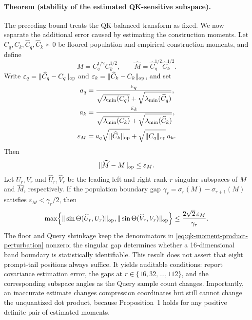 \paragraph{Theorem (stability of the estimated QK-sensitive subspace).}
The preceding bound treats the QK-balanced transform as fixed.  We now
separate the additional error caused by estimating the construction moments.
Let $C_q,C_k,\widehat C_q,\widehat C_k\succ0$ be floored population and
empirical construction moments, and define
\begin{equation}
 M=C_q^{1/2}C_k^{1/2},\qquad
 \widehat M=\widehat C_q^{1/2}\widehat C_k^{1/2}.
\end{equation}
Write $\varepsilon_q=\|\widehat C_q-C_q\|_{\mathrm{op}}$ and
$\varepsilon_k=\|\widehat C_k-C_k\|_{\mathrm{op}}$, and set
\begin{align}
 a_q&=
 \frac{\varepsilon_q}
 {\sqrt{\lambda_{\min}(C_q)}
  +\sqrt{\lambda_{\min}(\widehat C_q)}},\\
 a_k&=
 \frac{\varepsilon_k}
 {\sqrt{\lambda_{\min}(C_k)}
  +\sqrt{\lambda_{\min}(\widehat C_k)}},\\
 \varepsilon_M&=
 a_q\sqrt{\|\widehat C_k\|_{\mathrm{op}}}
 +\sqrt{\|C_q\|_{\mathrm{op}}}\,a_k .
 \label{eq:qk-moment-product-perturbation}
\end{align}
Then
\begin{equation}
 \|\widehat M-M\|_{\mathrm{op}}\le\varepsilon_M.
 \label{eq:qk-product-stability}
\end{equation}
Let $U_r,V_r$ and $\widehat U_r,\widehat V_r$ be the leading left and
right rank-$r$ singular subspaces of $M$ and $\widehat M$, respectively.
If the population boundary gap
$\gamma_r=\sigma_r(M)-\sigma_{r+1}(M)$ satisfies
$\varepsilon_M<\gamma_r/2$, then
\begin{equation}
 \max\!\left\{
 \|\sin\Theta(\widehat U_r,U_r)\|_{\mathrm{op}},
 \|\sin\Theta(\widehat V_r,V_r)\|_{\mathrm{op}}
 \right\}
 \le \frac{2\sqrt{2}\,\varepsilon_M}{\gamma_r}.
 \label{eq:qk-subspace-stability}
\end{equation}
The floor and Query shrinkage keep the denominators in
\cref{eq:qk-moment-product-perturbation} nonzero; the singular gap determines
whether a 16-dimensional band boundary is statistically identifiable.
This result does not assert that eight prompt-tail positions always suffice.
It yields auditable conditions: report covariance estimation error,
the gaps at $r\in\{16,32,\ldots,112\}$, and the corresponding subspace
angles as the Query sample count changes.  Importantly, an inaccurate
estimate changes compression coordinates but still cannot change the
unquantized dot product, because Proposition~1 holds for any positive
definite pair of estimated moments.

